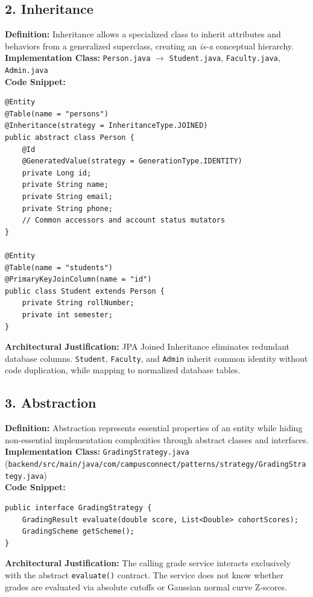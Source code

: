 \documentclass[12pt,a4paper,oneside]{report}
\begin{document}
\subsection{2. Inheritance}
\textbf{Definition:} Inheritance allows a specialized class to inherit attributes and behaviors from a generalized superclass, creating an \textit{is-a} conceptual hierarchy.\\[0.2cm]
\textbf{Implementation Class:} \texttt{Person.java} $\to$ \texttt{Student.java}, \texttt{Faculty.java}, \texttt{Admin.java}\\[0.2cm]
\textbf{Code Snippet:}
\begin{lstlisting}
@Entity
@Table(name = "persons")
@Inheritance(strategy = InheritanceType.JOINED)
public abstract class Person {
    @Id
    @GeneratedValue(strategy = GenerationType.IDENTITY)
    private Long id;
    private String name;
    private String email;
    private String phone;
    // Common accessors and account status mutators
}

@Entity
@Table(name = "students")
@PrimaryKeyJoinColumn(name = "id")
public class Student extends Person {
    private String rollNumber;
    private int semester;
}
\end{lstlisting}
\textbf{Architectural Justification:} JPA Joined Inheritance eliminates redundant database columns. \texttt{Student}, \texttt{Faculty}, and \texttt{Admin} inherit common identity without code duplication, while mapping to normalized database tables.

\subsection{3. Abstraction}
\textbf{Definition:} Abstraction represents essential properties of an entity while hiding non-essential implementation complexities through abstract classes and interfaces.\\[0.2cm]
\textbf{Implementation Class:} \texttt{GradingStrategy.java} (\texttt{backend/src/main/java/com/campusconnect/patterns/strategy/GradingStrategy.java})\\[0.2cm]
\textbf{Code Snippet:}
\begin{lstlisting}
public interface GradingStrategy {
    GradingResult evaluate(double score, List<Double> cohortScores);
    GradingScheme getScheme();
}
\end{lstlisting}
\textbf{Architectural Justification:} The calling grade service interacts exclusively with the abstract \texttt{evaluate()} contract. The service does not know whether grades are evaluated via absolute cutoffs or Gaussian normal curve Z-scores.
\end{document}
